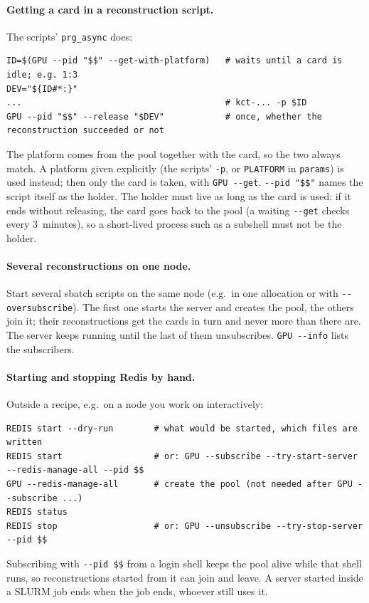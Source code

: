 \documentclass[11pt,a4paper]{article}
\newcommand{\cmd}[1]{\texttt{#1}}
\begin{document}
\paragraph{Getting a card in a reconstruction script.}
The scripts' \cmd{prg\_async} does:
\begin{lstlisting}
ID=$(GPU --pid "$$" --get-with-platform)   # waits until a card is idle; e.g. 1:3
DEV="${ID#*:}"
...                                        # kct-... -p $ID
GPU --pid "$$" --release "$DEV"            # once, whether the reconstruction succeeded or not
\end{lstlisting}
The platform comes from the pool together with the card, so the two always match. A platform
given explicitly (the scripts' \cmd{-p}, or \cmd{PLATFORM} in \cmd{params}) is used instead; then
only the card is taken, with \cmd{GPU -{}-get}.
\cmd{-{}-pid "\$\$"} names the script itself as the holder. The holder must live as long as the
card is used: if it ends without releasing, the card goes back to the pool (a waiting \cmd{-{}-get}
checks every 3~minutes), so a short-lived process such as a subshell must not be the holder.

\paragraph{Several reconstructions on one node.}
Start several sbatch scripts on the same node (e.g.\ in one allocation or with
\cmd{-{}-oversubscribe}). The first one starts the server and creates the pool, the others join it;
their reconstructions get the cards in turn and never more than there are. The server keeps
running until the last of them unsubscribes. \cmd{GPU -{}-info} lists the subscribers.

\paragraph{Starting and stopping Redis by hand.}
Outside a recipe, e.g.\ on a node you work on interactively:
\begin{lstlisting}
REDIS start --dry-run        # what would be started, which files are written
REDIS start                  # or: GPU --subscribe --try-start-server --redis-manage-all --pid $$
GPU --redis-manage-all       # create the pool (not needed after GPU --subscribe ...)
REDIS status
REDIS stop                   # or: GPU --unsubscribe --try-stop-server --pid $$
\end{lstlisting}
Subscribing with \cmd{-{}-pid \$\$} from a login shell keeps the pool alive while that shell runs,
so reconstructions started from it can join and leave. A server started inside a SLURM job ends
when the job ends, whoever still uses it.
\end{document}
